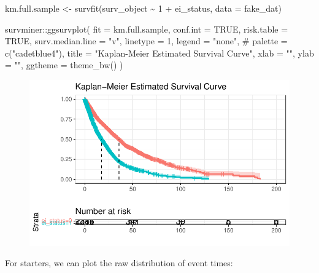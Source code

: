 \documentclass[
  letterpaper,
  DIV=11,
  numbers=noendperiod]{scrreprt}
\newenvironment{Shaded}{\begin{snugshade}}{\end{snugshade}}
\newcommand{\AttributeTok}[1]{\textcolor[rgb]{0.40,0.45,0.13}{#1}}
\newcommand{\CommentTok}[1]{\textcolor[rgb]{0.37,0.37,0.37}{#1}}
\newcommand{\ConstantTok}[1]{\textcolor[rgb]{0.56,0.35,0.01}{#1}}
\newcommand{\DecValTok}[1]{\textcolor[rgb]{0.68,0.00,0.00}{#1}}
\newcommand{\FunctionTok}[1]{\textcolor[rgb]{0.28,0.35,0.67}{#1}}
\newcommand{\NormalTok}[1]{\textcolor[rgb]{0.00,0.23,0.31}{#1}}
\newcommand{\OtherTok}[1]{\textcolor[rgb]{0.00,0.23,0.31}{#1}}
\newcommand{\SpecialCharTok}[1]{\textcolor[rgb]{0.37,0.37,0.37}{#1}}
\newcommand{\StringTok}[1]{\textcolor[rgb]{0.13,0.47,0.30}{#1}}
\begin{document}
\begin{Shaded}
\begin{Highlighting}[]
\NormalTok{km.full.sample }\OtherTok{\textless{}{-}} \FunctionTok{survfit}\NormalTok{(surv\_object }\SpecialCharTok{\textasciitilde{}} \DecValTok{1} \SpecialCharTok{+}\NormalTok{ ei\_status, }\AttributeTok{data =}\NormalTok{ fake\_dat)}

\NormalTok{survminer}\SpecialCharTok{::}\FunctionTok{ggsurvplot}\NormalTok{(}
  \AttributeTok{fit =}\NormalTok{ km.full.sample,}
  \AttributeTok{conf.int =} \ConstantTok{TRUE}\NormalTok{,}
  \AttributeTok{risk.table =} \ConstantTok{TRUE}\NormalTok{,}
  \AttributeTok{surv.median.line =} \StringTok{"v"}\NormalTok{,}
  \AttributeTok{linetype =} \DecValTok{1}\NormalTok{,}
  \AttributeTok{legend =} \StringTok{"none"}\NormalTok{,}
  \CommentTok{\#  palette = c("cadetblue4"),}
  \AttributeTok{title =} \StringTok{"Kaplan{-}Meier Estimated Survival Curve"}\NormalTok{,}
  \AttributeTok{xlab =} \StringTok{""}\NormalTok{, }
  \AttributeTok{ylab =} \StringTok{""}\NormalTok{,}
  \AttributeTok{ggtheme =} \FunctionTok{theme\_bw}\NormalTok{()}
\NormalTok{) }
\end{Highlighting}
\end{Shaded}

\begin{figure}[H]

{\centering \includegraphics{./bayesian-cfa_files/figure-pdf/unnamed-chunk-22-1.pdf}

}

\end{figure}

For starters, we can plot the raw distribution of event times:
\end{document}
